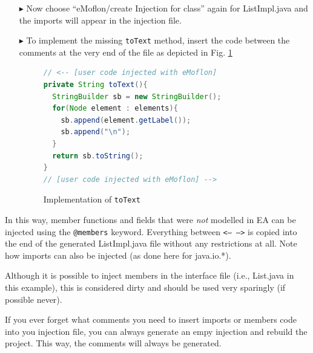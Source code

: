 \begin{enumerate}
  \item[$\blacktriangleright$] Now choose ``eMoflon/create Injection for class'' again for \textsf{ListImpl.java} and the imports will appear in the injection file.

  \item[$\blacktriangleright$] To implement the missing \texttt{toText} method, insert the code between the comments at the very end of the file as depicted in Fig. \ref{code:toText_impl}

\begin{figure}[htbp]
\centering
  \begin{lstlisting}[language=Java, keywordstyle={\bfseries\color{purple}}, backgroundcolor=\color{white}]
// <-- [user code injected with eMoflon]
private String toText(){
  StringBuilder sb = new StringBuilder();
  for(Node element : elements){
    sb.append(element.getLabel());
    sb.append("\n");
  }
  return sb.toString();
}
// [user code injected with eMoflon] -->
  \end{lstlisting}
\caption{Implementation of \texttt{toText}}
\label{code:toText_impl}
\end{figure}

\end{enumerate}

In this way, member functions and fields that were \emph{not} modelled in EA can be injected using the \texttt{@members} keyword. 
Everything between \texttt{<--  -->} is copied into the end of the generated \textsf{ListImpl.java} file without any restrictions at all.
Note how imports can also be injected (as done here for \textsf{java.io.*}). 

Although it is possible to inject members in the interface file (i.e., \textsf{List.java} in this example), this is considered dirty and should be used very sparingly (if possible never).

If you ever forget what comments you need to insert imports or members code into you injection file, you can always generate an empy injection and rebuild the project. This way, the comments will always be generated.

\clearpage